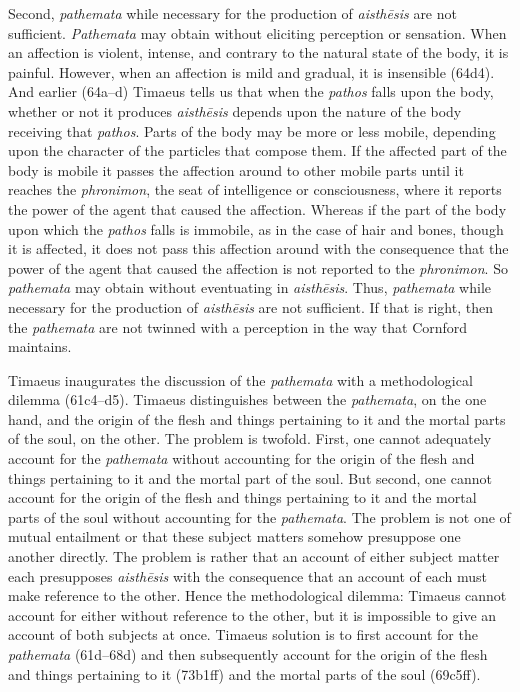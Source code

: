 Second, \emph{pathemata} while necessary for the production of \emph{aisthēsis} are not sufficient. \emph{Pathemata} may obtain without eliciting perception or sensation. When an affection is violent, intense, and contrary to the natural state of the body, it is painful. However, when an affection is mild and gradual, it is insensible (64d4). And earlier (64a--d) Timaeus tells us that when the \emph{pathos} falls upon the body, whether or not it produces \emph{aisthēsis} depends upon the nature of the body receiving that \emph{pathos}. Parts of the body may be more or less mobile, depending upon the character of the particles that compose them. If the affected part of the body is mobile it passes the affection around to other mobile parts until it reaches the \emph{phronimon}, the seat of intelligence or consciousness, where it reports the power of the agent that caused the affection. Whereas if the part of the body upon which the \emph{pathos} falls is immobile, as in the case of hair and bones, though it is affected, it does not pass this affection around with the consequence that the power of the agent that caused the affection is not reported to the \emph{phronimon}. So \emph{pathemata} may obtain without eventuating in \emph{aisthēsis}. Thus, \emph{pathemata} while necessary for the production of \emph{aisthēsis} are not sufficient. If that is right, then the \emph{pathemata} are not twinned with a perception in the way that Cornford maintains.

Timaeus inaugurates the discussion of the \emph{pathemata} with a methodological dilemma (61c4--d5). Timaeus distinguishes between the \emph{pathemata}, on the one hand, and the origin of the flesh and things pertaining to it and the mortal parts of the soul, on the other. The problem is twofold. First, one cannot adequately account for the \emph{pathemata} without accounting for the origin of the flesh and things pertaining to it and the mortal part of the soul. But second, one cannot account for the origin of the flesh and things pertaining to it and the mortal parts of the soul without accounting for the \emph{pathemata}. The problem is not one of mutual entailment or that these subject matters somehow presuppose one another directly. The problem is rather that an account of either subject matter each presupposes \emph{aisthēsis} with the consequence that an account of each must make reference to the other. Hence the methodological dilemma: Timaeus cannot account for either without reference to the other, but it is impossible to give an account of both subjects at once. Timaeus solution is to first account for the \emph{pathemata} (61d--68d) and then subsequently account for the origin of the flesh and things pertaining to it (73b1ff) and the mortal parts of the soul (69c5ff). 

